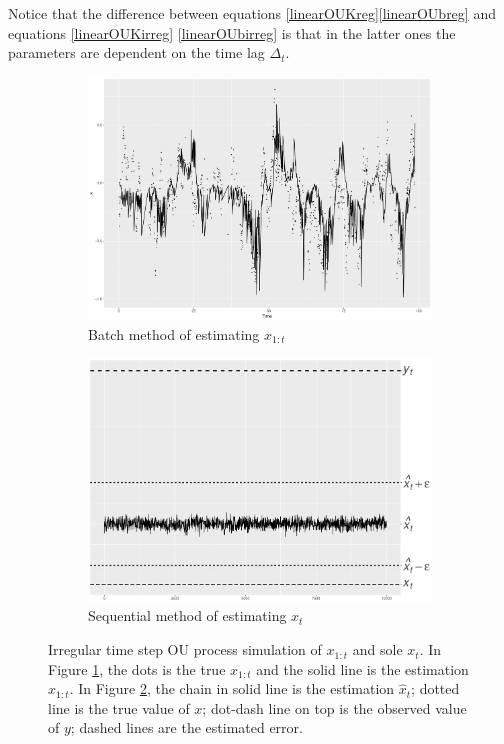 Notice that the difference between equations \eqref{linearOUKreg}\eqref{linearOUbreg} and equations  \eqref{linearOUKirreg} \eqref{linearOUbirreg} is that in the latter ones the parameters are dependent on the time lag $\Delta_t$. 

\begin{figure}[h]
\centering
\begin{subfigure}[h]{0.45\textwidth}
\includegraphics[width=\textwidth]{Chapters/05MCMCOU/plots/simudataOUallX.pdf}
\caption{Batch method of estimating $x_{1:t}$}\label{MCMCOUallX}
\end{subfigure}
\begin{subfigure}[h]{0.45\textwidth}
\includegraphics[width=\textwidth]{Chapters/05MCMCOU/plots/simudataOUXt2.pdf}
\caption{Sequential method of estimating $x_t$}\label{MCMCOUallXt2}
\end{subfigure}
\caption{Irregular time step OU process simulation of $x_{1:t}$ and sole $x_t$. In Figure \ref{MCMCOUallX}, the dots is the true $x_{1:t}$ and the solid line is the estimation $\hat{x}_{1:t}$. In Figure \ref{MCMCOUallXt2}, the chain in solid line is the estimation $\hat{x}_t$; dotted line is the true value of $x$; dot-dash line on top is the observed value of $y$; dashed lines are the estimated error. }
\label{simuOUxt}
\end{figure}




